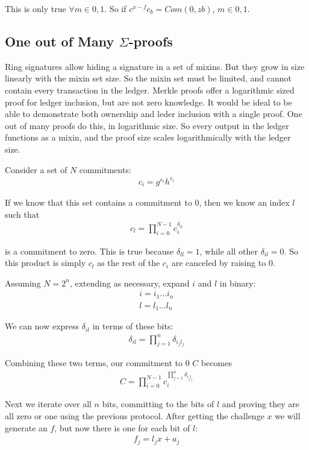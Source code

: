 \documentclass{article}
\begin{document}
This is only true $\forall m \in {0,1}$.  So if $c^{x-f} c_b = Com(0,zb)$, $m \in {0,1}$.


\subsection{One out of Many $\Sigma$-proofs}

Ring signatures allow hiding a signature in a set of mixins.  But they grow in size linearly with the mixin set size.  So the mixin set must be limited, and cannot contain every transaction in the ledger.  Merkle proofs offer a logarithmic sized proof for ledger inclusion, but are not zero knowledge.  It would be ideal to be able to demonstrate both ownership and leder inclusion with a single proof.  One out of many proofs do this, in logarithmic size.  So every output in the ledger functions as a mixin, and the proof size scales logarithmically with the ledger size.

Consider a set of $N$ commitments:
\begin{eqnarray}
  c_i = g^{s_i} h^{v_i}
\end{eqnarray}

If we know that this set contains a commitment to $0$, then we know an index $l$ such that
\begin{eqnarray}
  c_l = \prod_{i=0}^{N-1} c_i^{\delta_{il}}
\end{eqnarray}

is a commitment to zero.  This is true because $\delta_{ll} = 1$, while all other $\delta_{il} = 0$. So this product is simply $c_l$ as the rest of the $c_i$ are canceled by raising to $0$.

Assuming $N = 2^n$, extending as necessary, expand $i$ and $l$ in binary:
\begin{eqnarray}
  i = i_1...i_n\\
  l = l_1...l_n
\end{eqnarray}

We can now express $\delta_{il}$ in terms of these bits:
\begin{eqnarray}
  \delta_{il} = \prod_{j=1}^{n} \delta_{i_jl_j}
\end{eqnarray}
  
Combining these two terms, our commitment to $0$ $C$ becomes
\begin{eqnarray}
  C = \prod_{i=0}^{N-1}c_i^{\prod_{j=1}^{n} \delta_{i_jl_j}}
\end{eqnarray}

Next we iterate over all $n$ bits, committing to the bits of $l$ and proving they are all zero or one using the previous protocol.  After getting the challenge $x$ we will generate an $f$, but now there is one for each bit of $l$:
\begin{eqnarray}
  f_j = l_j x + a_j
\end{eqnarray}
\end{document}
